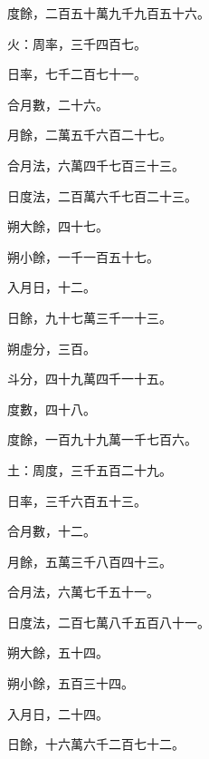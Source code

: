 \begin{pinyinscope}
 度餘，二百五十萬九千九百五十六。



 火：周率，三千四百七。



 日率，七千二百七十一。



 合月數，二十六。



 月餘，二萬五千六百二十七。



 合月法，六萬四千七百三十三。



 日度法，二百萬六千七百二十三。



 朔大餘，四十七。



 朔小餘，一千一百五十七。



 入月日，十二。



 日餘，九十七萬三千一十三。



 朔虛分，三百。



 斗分，四十九萬四千一十五。



 度數，四十八。



 度餘，一百九十九萬一千七百六。



 土：周度，三千五百二十九。



 日率，三千六百五十三。



 合月數，十二。



 月餘，五萬三千八百四十三。



 合月法，六萬七千五十一。



 日度法，二百七萬八千五百八十一。



 朔大餘，五十四。



 朔小餘，五百三十四。



 入月日，二十四。



 日餘，十六萬六千二百七十二。




\end{pinyinscope}

